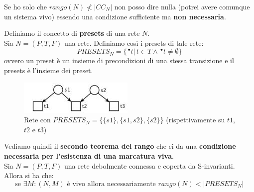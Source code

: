 \documentclass[a4paper,12pt, oneside]{book}
\begin{document}
Se ho solo che $rango(N)\not < |CC_N|$ non posso dire nulla (potrei avere
comunque un sistema vivo) essendo una condizione sufficiente ma \textbf{non
  necessaria}.
\newpage
\begin{definizione}
  Definiamo il concetto di \textbf{presets} di una rete $N$.\\
  Sia $ N = (P, T , F )$ una rete. Definiamo così i presets di tale rete:
  \[PRESETS_N=\{\,^\bullet t|\,t\in T\land \,^\bullet t\neq \emptyset\}\]
  ovvero un preset è un insieme di precondizioni di una stessa transizione e il
  presets è l'insieme dei preset.
  \begin{figure}[H]
    \centering
    \includegraphics[scale = 0.8]{img/cc6.jpg}
    \caption{Rete con $PRESETS_N=\{\{s1\},\{s1,s2\},\{s2\}\}$ (rispettivamente
      su $t1$, $t2$ e $t3$)}
  \end{figure}
\end{definizione}
\begin{teorema}
  Vediamo quindi il \textbf{secondo teorema del rango} che ci da una
  \textbf{condizione necessaria per l’esistenza di una marcatura viva}.\\ 
  Sia $N = (P, T , F )$ una rete debolmente connessa e coperta da
  S-invarianti. Allora si ha che:
  \[\mbox{se }\exists M:(N,M) \mbox{ è vivo allora necessariamente }
    rango(N)<|PRESETS_N|\]  
\end{teorema}
\end{document}
